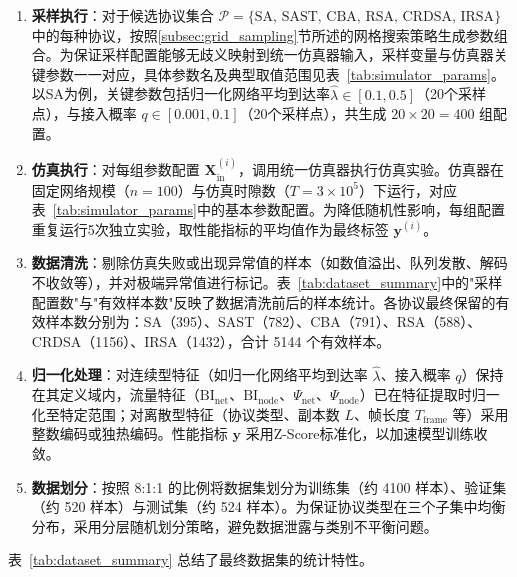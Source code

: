 \begin{enumerate}[leftmargin=*]
	\item \textbf{采样执行}：对于候选协议集合 $\mathcal{P} = \{\text{SA, SAST, CBA, RSA, CRDSA, IRSA}\}$ 中的每种协议，按照\ref{subsec:grid_sampling}节所述的网格搜索策略生成参数组合。为保证采样配置能够无歧义映射到统一仿真器输入，采样变量与仿真器关键参数一一对应，具体参数名及典型取值范围见表~\ref{tab:simulator_params}。以SA为例，关键参数包括归一化网络平均到达率$\hat{\lambda} \in [0.1, 0.5]$（20个采样点），与接入概率 $q \in [0.001, 0.1]$（20个采样点），共生成 $20 \times 20 = 400$ 组配置。
	
	\item \textbf{仿真执行}：对每组参数配置 $\mathbf{X}_{\text{in}}^{(i)}$，调用统一仿真器执行仿真实验。仿真器在固定网络规模（$n=100$）与仿真时隙数（$T=3 \times 10^5$）下运行，对应表~\ref{tab:simulator_params}中的基本参数配置。为降低随机性影响，每组配置重复运行5次独立实验，取性能指标的平均值作为最终标签 $\mathbf{y}^{(i)}$。
	
	\item \textbf{数据清洗}：剔除仿真失败或出现异常值的样本（如数值溢出、队列发散、解码不收敛等），并对极端异常值进行标记。表~\ref{tab:dataset_summary}中的"采样配置数"与"有效样本数"反映了数据清洗前后的样本统计。各协议最终保留的有效样本数分别为：SA（395）、SAST（782）、CBA（791）、RSA（588）、CRDSA（1156）、IRSA（1432），合计 5144 个有效样本。
	
	\item \textbf{归一化处理}：对连续型特征（如归一化网络平均到达率 $\hat{\lambda}$、接入概率 $q$）保持在其定义域内，流量特征（$\mathrm{BI}_{\mathrm{net}}$、$\mathrm{BI}_{\mathrm{node}}$、$\Psi_{\mathrm{net}}$、$\Psi_{\mathrm{node}}$）已在特征提取时归一化至特定范围；对离散型特征（协议类型、副本数 $L$、帧长度 $T_{\mathrm{frame}}$ 等）采用整数编码或独热编码。性能指标 $\mathbf{y}$ 采用Z-Score标准化，以加速模型训练收敛。
	
	\item \textbf{数据划分}：按照 8:1:1 的比例将数据集划分为训练集（约 4100 样本）、验证集（约 520 样本）与测试集（约 524 样本）。为保证协议类型在三个子集中均衡分布，采用分层随机划分策略，避免数据泄露与类别不平衡问题。
\end{enumerate}

表~\ref{tab:dataset_summary} 总结了最终数据集的统计特性。

